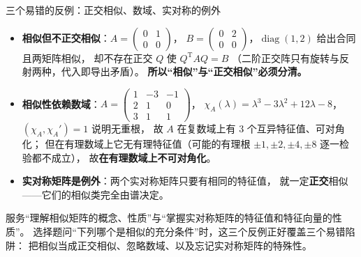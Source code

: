 \begin{fdeep}{三个易错的反例：正交相似、数域、实对称的例外}
\begin{itemize}[leftmargin=1.8em,itemsep=0.25em]
\item \textbf{相似但不正交相似}：$A=\begin{pmatrix}0&1\\0&0\end{pmatrix}$，
      $B=\begin{pmatrix}0&2\\0&0\end{pmatrix}$，$\operatorname{diag}(1,2)$ 给出合同且两矩阵相似，
      却不存在正交 $Q$ 使 $Q^{\mathrm T}AQ=B$
      （二阶正交阵只有旋转与反射两种，代入即导出矛盾）。
      \textbf{所以“相似”与“正交相似”必须分清。}
\item \textbf{相似性依赖数域}：$A=\begin{pmatrix}1&-3&-1\\2&1&0\\3&1&1\end{pmatrix}$，
      $\chi_A(\lambda)=\lambda^{3}-3\lambda^{2}+12\lambda-8$，$(\chi_A,\chi_A')=1$ 说明无重根，
      故 $A$ 在复数域上有 $3$ 个互异特征值、可对角化；
      但在有理数域上它无有理特征值（可能的有理根 $\pm1,\pm2,\pm4,\pm8$ 逐一检验都不成立），
      故\textbf{在有理数域上不可对角化}。
\item \textbf{实对称矩阵是例外}：两个实对称矩阵只要有相同的特征值，
      就一定\textbf{正交}相似——它们的相似类完全由谱决定。
\end{itemize}
\fbref{}服务“理解相似矩阵的概念、性质”与“掌握实对称矩阵的特征值和特征向量的性质”。
选择题问“下列哪个是相似的充分条件”时，这三个反例正好覆盖三个易错陷阱：
把相似当成正交相似、忽略数域、以及忘记实对称矩阵的特殊性。
\end{fdeep}


